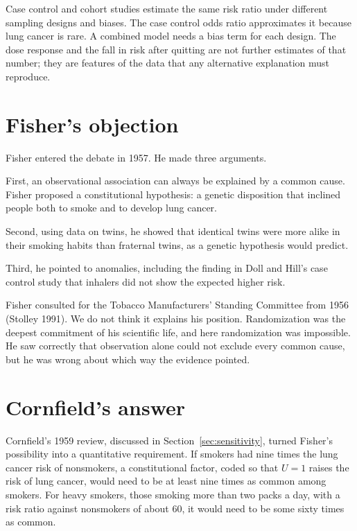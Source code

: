 Case control and cohort studies estimate the same risk ratio under different sampling designs and biases. The case control odds ratio approximates it because lung cancer is rare. A combined model needs a bias term for each design. The dose response and the fall in risk after quitting are not further estimates of that number; they are features of the data that any alternative explanation must reproduce.

\section{Fisher's objection}

Fisher entered the debate in 1957. He made three arguments.

First, an observational association can always be explained by a common cause. Fisher proposed a constitutional hypothesis: a genetic disposition that inclined people both to smoke and to develop lung cancer.

Second, using data on twins, he showed that identical twins were more alike in their smoking habits than fraternal twins, as a genetic hypothesis would predict.

Third, he pointed to anomalies, including the finding in Doll and Hill's case control study that inhalers did not show the expected higher risk.

Fisher consulted for the Tobacco Manufacturers' Standing Committee from 1956 (Stolley 1991). We do not think it explains his position. Randomization was the deepest commitment of his scientific life, and here randomization was impossible. He saw correctly that observation alone could not exclude every common cause, but he was wrong about which way the evidence pointed.

\section{Cornfield's answer}

Cornfield's 1959 review, discussed in Section~\ref{sec:sensitivity}, turned Fisher's possibility into a quantitative requirement. If smokers had nine times the lung cancer risk of nonsmokers, a constitutional factor, coded so that $U = 1$ raises the risk of lung cancer, would need to be at least nine times as common among smokers. For heavy smokers, those smoking more than two packs a day, with a risk ratio against nonsmokers of about 60, it would need to be some sixty times as common.

